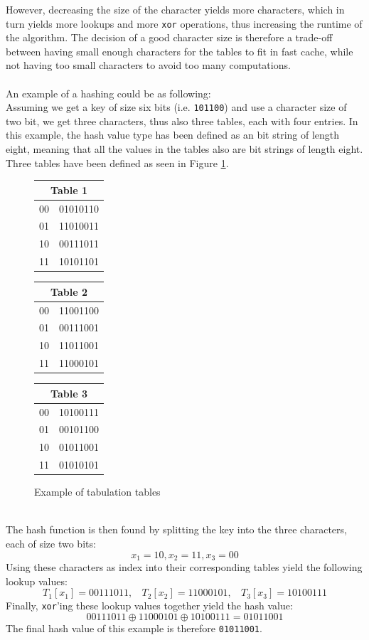 \documentclass[11pt]{report} %
\begin{document}
However, decreasing the size of the character yields more characters, which in turn yields more lookups and more \verb|xor| operations, thus increasing the runtime of the algorithm. The decision of a good character size is therefore a trade-off between having small enough characters for the tables to fit in fast cache, while not having too small characters to avoid too many computations.\\
\\
An example of a hashing could be as following:\\ Assuming we get a key of size six bits (i.e. \verb|101100|) and use a character size of two bit, we get three characters, thus also three tables, each with four entries. In this example, the hash value type has been defined as an bit string of length eight, meaning that all the values in the tables also are bit strings of length eight. Three tables have been defined as seen in Figure \ref{fig:tabulation_tables}.\\
\begin{figure}
  \quad\quad\quad\quad\quad
  \begin{tabular}{|c|c|}
  \hline
  \multicolumn{2}{|c|}{Table 1}\\
  \hline
  00&01010110\\
  01&11010011\\
  10&00111011\\
  11&10101101\\
  \hline
  \end{tabular}
  \quad\quad\quad\quad
  \begin{tabular}{|c|c|}
  \hline
  \multicolumn{2}{|c|}{Table 2}\\
  \hline
  00&11001100\\
  01&00111001\\
  10&11011001\\
  11&11000101\\
  \hline
  \end{tabular}
  \quad\quad\quad\quad
  \begin{tabular}{|c|c|}
  \hline
  \multicolumn{2}{|c|}{Table 3}\\
  \hline
  00&10100111\\
  01&00101100\\
  10&01011001\\
  11&01010101\\
  \hline
  \end{tabular}
  \caption{Example of tabulation tables}
  \label{fig:tabulation_tables} 
\end{figure}
\noindent\\
The hash function is then found by splitting the key into the three characters, each of size two bits: $$x_1 = 10, x_2 = 11, x_3 = 00$$ Using these characters as index into their corresponding tables yield the following lookup values: $$T_1[x_1] = 00111011,\ \ \ \ T_2[x_2] = 11000101,\ \ \ \ T_3[x_3] = 10100111$$ Finally, \verb|xor|'ing these lookup values together yield the hash value: $$00111011 \oplus 11000101 \oplus 10100111 = 01011001$$
The final hash value of this example is therefore \verb|01011001|.
\end{document}
